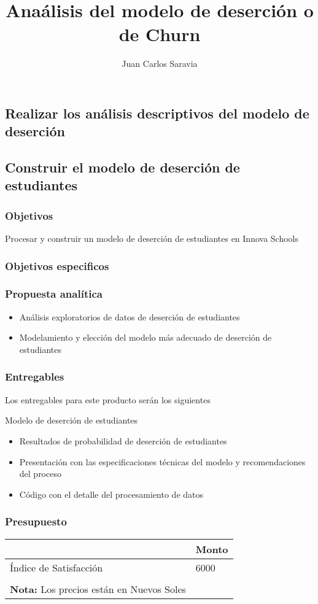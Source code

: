 \documentclass{beamer}
\title{Anaálisis del modelo de deserción o de Churn}
\author{Juan Carlos Saravia}
\date{}
\begin{document}
\begin{frame}
\titlepage
\end{frame}


\subsection{Realizar los análisis descriptivos del modelo de deserción}
\subsection{Construir el modelo de deserción de estudiantes}


\begin{frame}
\frametitle{Objetivos}
Procesar y construir un modelo de deserción de estudiantes en Innova Schools
\end{frame}



\begin{frame}
\frametitle{Objetivos especificos}
\tableofcontents
\end{frame}

\begin{frame}
\frametitle{Propuesta analítica}

\begin{itemize}
\item Análisis exploratorios de datos de deserción de estudiantes
\item Modelamiento y elección del modelo más adecuado de deserción de estudiantes
\end{itemize}	

\end{frame}

\begin{frame}
\frametitle{Entregables}

Los entregables para este producto serán los siguientes 

\begin{block}{Modelo de deserción de estudiantes}
\begin{itemize}
\item Resultados de probabilidad de deserción de estudiantes
\item Presentación con las especificaciones técnicas del modelo y recomendaciones del proceso
\item Código con el detalle del procesamiento de datos
\end{itemize}
\end{block}
\end{frame}

\begin{frame}
\frametitle{Presupuesto}
\begin{table}[ht]
\begin{tabular}{ll}
\hline
                       & Monto \\ \hline
Índice de Satisfacción & 6000  \\ \hline 
\\

\textbf{Nota:} Los precios están en \alert{Nuevos Soles}
\end{tabular}
\end{table}





\end{frame}
\end{document}
